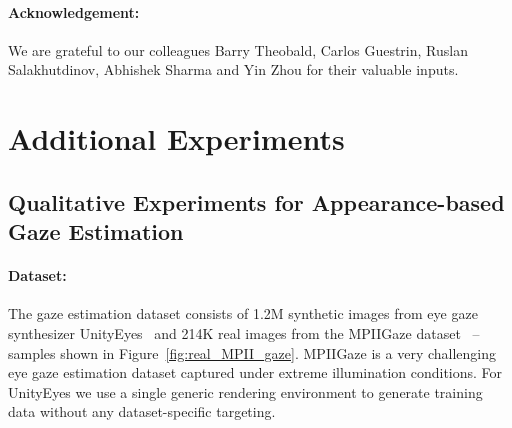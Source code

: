 \documentclass[10pt,twocolumn,letterpaper]{article}
\begin{document}
\paragraph{Acknowledgement:} 
We are grateful to our colleagues Barry Theobald, Carlos Guestrin, Ruslan Salakhutdinov, Abhishek Sharma and Yin Zhou for their valuable inputs.

\pagebreak





\clearpage

\section*{Additional Experiments }


\subsection*{Qualitative Experiments for Appearance-based Gaze Estimation}


\paragraph{Dataset:} The gaze estimation dataset consists of 1.2M synthetic images from eye gaze synthesizer UnityEyes~\cite{Wood16} and 214K real images from the MPIIGaze dataset~\cite{Zhang15a} -- samples shown in Figure~\ref{fig:real_MPII_gaze}.
MPIIGaze is a very challenging eye gaze estimation dataset captured under extreme illumination conditions.
For UnityEyes we use a single generic rendering environment to generate training data without any dataset-specific targeting.
\end{document}
